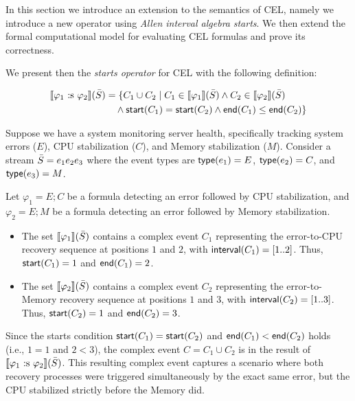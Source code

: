 In this section we introduce an extension to the semantics of CEL, namely we introduce a new operator using \textit{Allen interval algebra} \textit{starts}.
We then extend the formal computational model for evaluating CEL formulas and prove its correctness.

We present then the \emph{starts operator} for CEL with the following definition:


$$\begin{aligned} 	\sem{\varphi_1 \starts \varphi_2}(\Stream) 	&= \{C_1 \cup C_2 \mid C_1 \in \sem{\varphi_1}(\Stream)  	\land C_2 \in \sem{\varphi_2}(\Stream) \\ 	&\quad \land \cstart(C_1) = \cstart(C_2) \land \cend(C_1) \leq \cend(C_2)\} \end{aligned}$$

\begin{example} Suppose we have a system monitoring server health, specifically tracking system errors ($E$), CPU stabilization ($C$), and Memory stabilization ($M$). Consider a stream $\bar{S} = e_1 e_2 e_3$ where the event types are $\mathsf{type}(e_1) = E$, $\mathsf{type}(e_2) = C$, and $\mathsf{type}(e_3) = M$.

Let $\varphi_1 = E ; C$ be a formula detecting an error followed by CPU stabilization, and $\varphi_2 = E ; M$ be a formula detecting an error followed by Memory stabilization.
\begin{itemize}
	\item The set $\sem{\varphi_1}(\Stream)$ contains a complex event $C_1$ representing the error-to-CPU recovery sequence at positions $1$ and $2$, with $\mathsf{interval}(C_1) = [1..2]$. Thus, $\mathsf{start}(C_1) = 1$ and $\mathsf{end}(C_1) = 2$.
	\item The set $\sem{\varphi_2}(\Stream)$ contains a complex event $C_2$ representing the error-to-Memory recovery sequence at positions $1$ and $3$, with $\mathsf{interval}(C_2) = [1..3]$. Thus, $\mathsf{start}(C_2) = 1$ and $\mathsf{end}(C_2) = 3$.
\end{itemize}

Since the starts condition $\mathsf{start}(C_1) = \mathsf{start}(C_2)$ and $\mathsf{end}(C_1) < \mathsf{end}(C_2)$ holds (i.e., $1 = 1$ and $2 < 3$), the complex event $C = C_1 \cup C_2$ is in the result of $\sem{\varphi_1 \starts \varphi_2}(\Stream)$. This resulting complex event captures a scenario where both recovery processes were triggered simultaneously by the exact same error, but the CPU stabilized strictly before the Memory did.
\end{example}

